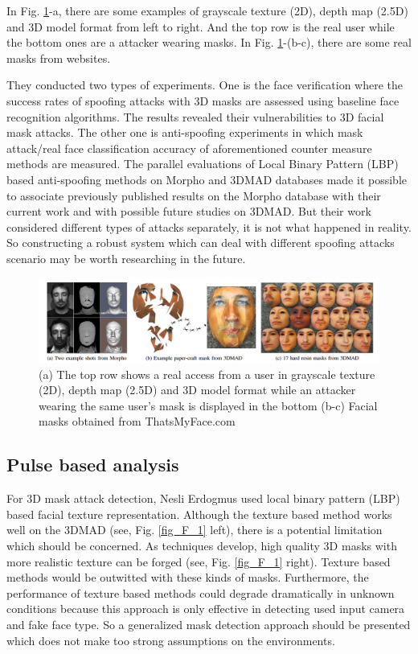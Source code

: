 \documentclass[journal]{IEEEtran}
\begin{document}
In Fig. \ref{fig_3D_1}-a, there are some examples of grayscale texture (2D), depth map (2.5D) and 3D model format from left to right. And the top row is the real user while the bottom ones are a attacker wearing masks. In Fig. \ref{fig_3D_1}-(b-c), there are some real masks from websites.

They conducted two types of experiments. One is the face verification where the success rates of spoofing attacks with 3D masks are assessed using baseline face recognition algorithms. The results revealed their vulnerabilities to 3D facial mask attacks. The other one is anti-spoofing experiments in which mask attack/real face classification accuracy of aforementioned counter measure methods are measured. The parallel evaluations of Local Binary Pattern (LBP) \cite{kose2013countermeasure} based anti-spoofing methods on Morpho and 3DMAD databases made it possible to associate previously published results on the Morpho database with their current work and with possible future studies on 3DMAD. But their work considered different types of attacks separately, it is not what happened in reality. So constructing a robust system which can deal with different spoofing attacks scenario may be worth researching in the future.


\begin{figure}[!t]
\centering
\includegraphics[width=1\linewidth]{img/3D_1}
\caption{(a) The top row shows a real access from a user in grayscale texture (2D), depth map (2.5D) and 3D model format while an attacker wearing the same user's mask is displayed in the bottom (b-c) Facial masks obtained from ThatsMyFace.com}
\label{fig_3D_1}
\end{figure}

\subsection{Pulse based analysis}

For 3D mask attack detection,  Nesli Erdogmus used local binary pattern (LBP) \cite{erdogmus2014spoofing} based facial texture representation. Although the texture based method works well on the 3DMAD (see, Fig. \ref{fig_F_1} left), there is a potential limitation which should be concerned. As techniques develop, high quality 3D masks with more realistic texture can be forged  (see, Fig. \ref{fig_F_1} right). Texture based methods would be  outwitted with these kinds of masks. Furthermore, the performance of texture based methods could degrade dramatically in unknown conditions because this approach is only effective in detecting used input camera and fake face type.  So a generalized mask detection approach should be presented which does not make too strong assumptions on the environments.
\end{document}
